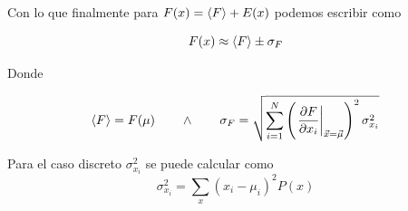 Con lo que finalmente para $F(x) = \left\langle F \right\rangle + E(x)$ podemos escribir como

\begin{equation}
  F(x) \approx \left\langle F \right\rangle \pm \sigma_F
  \label{eq:error-std}
\end{equation}

Donde

\begin{equation}
  \left\langle F \right\rangle = F(\mu) \qquad \wedge \qquad \sigma_F =
  \sqrt{\sum_{i=1}^N\left(\left.\frac{\partial F}{\partial x_i}\right|_{\vec x = \vec\mu}\right)^2\sigma^2_{x_i}}
  \label{eq:error-std-values}
\end{equation}

Para el caso discreto $\sigma^2_{x_i}$ se puede calcular como
\begin{equation}
  \sigma^2_{x_i} = \sum_x (x_i - \mu_i)^2 P(x)
  \label{eq:discrete-std-x-i}
\end{equation}
